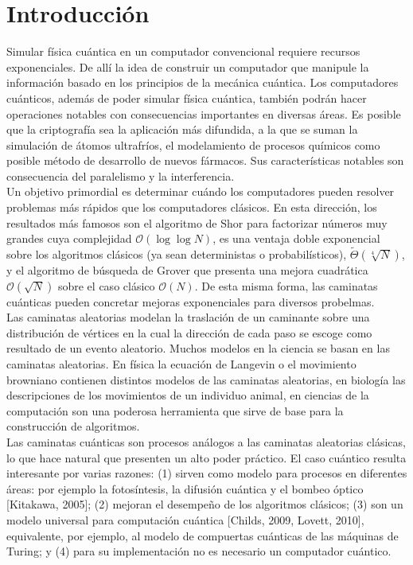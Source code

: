 \chapter{Introducci\'{o}n}
Simular física cuántica en un computador convencional requiere recursos exponenciales. De allí la idea de construir un computador que manipule la información basado en los principios de la mecánica cuántica. Los computadores cuánticos, además de poder simular física cuántica, también podrán hacer operaciones notables con consecuencias importantes en diversas áreas. 
Es posible que la criptografía sea la aplicación más difundida, a la que se suman la simulación de átomos ultrafríos, el modelamiento de procesos químicos como posible método de desarrollo de nuevos fármacos. Sus características notables son consecuencia del paralelismo y la interferencia.\\

Un objetivo primordial es determinar cuándo los computadores pueden resolver problemas más rápidos que los computadores clásicos. En esta dirección,
los resultados más famosos son el algoritmo de Shor para factorizar números muy grandes cuya complejidad $\mathcal{O}(\log\log N)$, es una ventaja doble exponencial sobre los algoritmos clásicos (ya sean deterministas o probabilísticos), $\widetilde{\Theta}(\sqrt[4]{N})$, y el algoritmo de búsqueda de Grover que presenta una mejora cuadrática $\mathcal{O}(\sqrt{N})$ sobre el caso clásico $\mathcal{O}(N)$. De esta misma forma, las caminatas cuánticas pueden concretar mejoras exponenciales para diversos probelmas.\\

Las caminatas aleatorias modelan la traslación de un caminante sobre una distribución de vértices en la cual la dirección de cada paso se escoge como resultado de un evento aleatorio. 
Muchos modelos en la ciencia se basan en las caminatas aleatorias. En física la ecuación de Langevin o el movimiento browniano contienen distintos modelos de las caminatas aleatorias, en biología las descripciones de los movimientos de un individuo animal, en ciencias de la computación son una poderosa herramienta que sirve de base para la construcción de algoritmos.\\

Las caminatas cuánticas son procesos análogos a las caminatas aleatorias clásicas, lo que hace natural que presenten un alto poder práctico. El caso cuántico resulta interesante por varias razones: (1) sirven como modelo para procesos en diferentes áreas: por ejemplo la fotosíntesis, la difusión cuántica y el bombeo óptico [Kitakawa, 2005]; (2) mejoran el desempeño de los algoritmos clásicos; (3) son un modelo universal para computación cuántica [Childs, 2009, Lovett, 2010], equivalente, por ejemplo, al modelo de compuertas cuánticas de las máquinas de Turing; y (4) para su implementación no es necesario un computador cuántico.\\

